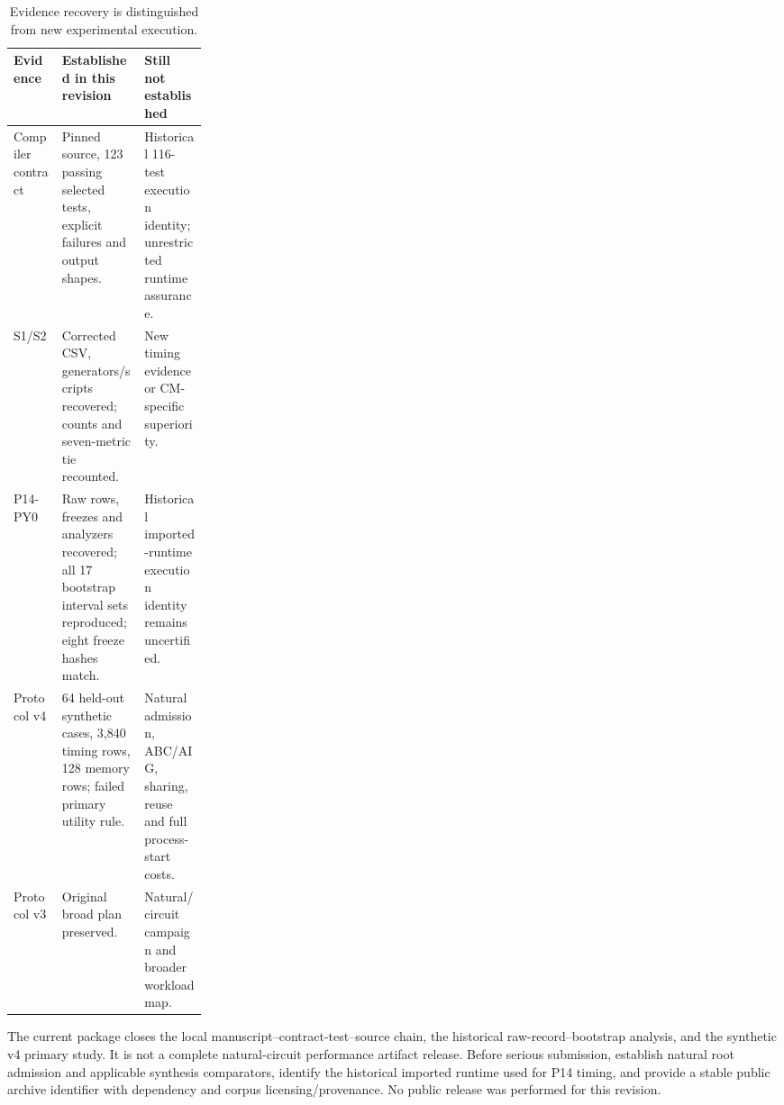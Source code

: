 \documentclass[10pt]{article}
\theoremstyle{plain}
\theoremstyle{definition}
\theoremstyle{remark}
\begin{document}
\begin{table}[H]
\small\centering
\begin{tabularx}{\linewidth}{@{}p{0.25\linewidth}XX@{}}
\toprule
\textbf{Evidence} & \textbf{Established in this revision} & \textbf{Still not established}\\
\midrule
Compiler contract & Pinned source, 123 passing selected tests, explicit failures and output shapes. & Historical 116-test execution identity; unrestricted runtime assurance.\\
S1/S2 & Corrected CSV, generators/scripts recovered; counts and seven-metric tie recounted. & New timing evidence or CM-specific superiority.\\
P14-PY0 & Raw rows, freezes and analyzers recovered; all 17 bootstrap interval sets reproduced; eight freeze hashes match. & Historical imported-runtime execution identity remains uncertified.\\
Protocol v4 & 64 held-out synthetic cases, 3,840 timing rows, 128 memory rows; failed primary utility rule. & Natural admission, ABC/AIG, sharing, reuse and full process-start costs.\\
Protocol v3 & Original broad plan preserved. & Natural/circuit campaign and broader workload map.\\
\bottomrule
\end{tabularx}
\caption{Evidence recovery is distinguished from new experimental execution.}
\end{table}

The current package closes the local manuscript--contract-test--source chain, the historical raw-record--bootstrap analysis, and the synthetic v4 primary study. It is not a complete natural-circuit performance artifact release. Before serious submission, establish natural root admission and applicable synthesis comparators, identify the historical imported runtime used for P14 timing, and provide a stable public archive identifier with dependency and corpus licensing/provenance. No public release was performed for this revision.
\end{document}
